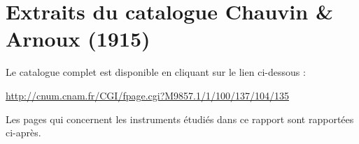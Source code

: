 \documentclass[12pt,a4paper,fleqn]{article}
\begin{document}
\newpage
\appendix



\newpage
\appendix


\section{Extraits du catalogue Chauvin \& Arnoux (1915)}
\label{ann:catalogue}

Le catalogue complet est disponible en cliquant sur le lien ci-dessous :

\noindent
\href{http://cnum.cnam.fr/CGI/fpage.cgi?M9857.1/1/100/137/104/135}{http://cnum.cnam.fr/CGI/fpage.cgi?M9857.1/1/100/137/104/135}

Les pages qui concernent les instruments étudiés dans ce rapport sont rapportées ci-après.


\end{document}
